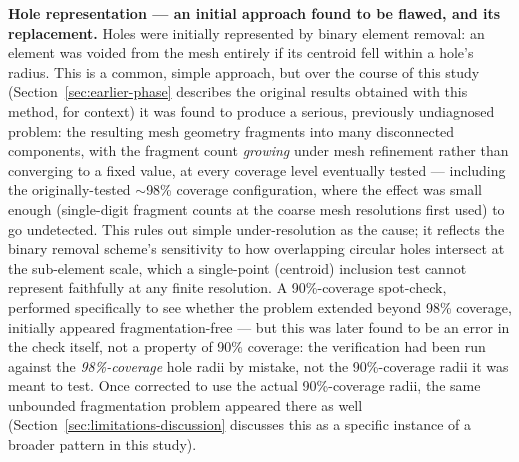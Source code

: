 \documentclass[11pt]{article}
\begin{document}
\textbf{Hole representation --- an initial approach found to be flawed, and its replacement.} Holes were initially represented by binary element removal: an element was voided from the mesh entirely if its centroid fell within a hole's radius. This is a common, simple approach, but over the course of this study (Section~\ref{sec:earlier-phase} describes the original results obtained with this method, for context) it was found to produce a serious, previously undiagnosed problem: the resulting mesh geometry fragments into many disconnected components, with the fragment count \textit{growing} under mesh refinement rather than converging to a fixed value, at every coverage level eventually tested --- including the originally-tested $\sim$98\% coverage configuration, where the effect was small enough (single-digit fragment counts at the coarse mesh resolutions first used) to go undetected. This rules out simple under-resolution as the cause; it reflects the binary removal scheme's sensitivity to how overlapping circular holes intersect at the sub-element scale, which a single-point (centroid) inclusion test cannot represent faithfully at any finite resolution. A 90\%-coverage spot-check, performed specifically to see whether the problem extended beyond 98\% coverage, initially appeared fragmentation-free --- but this was later found to be an error in the check itself, not a property of 90\% coverage: the verification had been run against the \textit{98\%-coverage} hole radii by mistake, not the 90\%-coverage radii it was meant to test. Once corrected to use the actual 90\%-coverage radii, the same unbounded fragmentation problem appeared there as well (Section~\ref{sec:limitations-discussion} discusses this as a specific instance of a broader pattern in this study).
\end{document}
